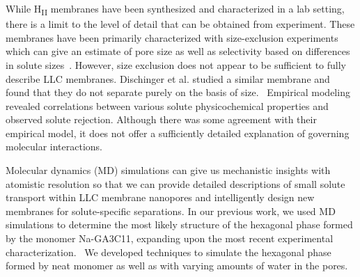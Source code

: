 \documentclass[journal=jpcbfk,manuscript=article]{achemso}
\begin{document}
  While H\textsubscript{II} membranes have been synthesized and characterized
  in a lab setting, there is a limit to the level of detail that can be obtained 
  from experiment. These membranes have been primarily characterized with 
  size-exclusion experiments which can give an estimate of pore size as well as
  selectivity based on differences in solute sizes~\cite{zhou_supported_2005}. 
  However, size exclusion does not appear to be sufficient to fully describe LLC
  membranes. Dischinger et al. studied a similar membrane and found that they do
  not separate purely on the basis of size.~\cite{dischinger_effect_2017} Empirical modeling revealed correlations
  between various solute physicochemical properties and observed solute rejection. 
  Although there was some agreement with their empirical model, it does not
  offer a sufficiently detailed explanation of governing molecular interactions.~\cite{dischinger_effect_2017}

  Molecular dynamics (MD) simulations can give us mechanistic insights with 
  atomistic resolution so that we can provide detailed descriptions of
  small solute transport within LLC membrane nanopores and intelligently design new membranes for 
  solute-specific separations. In our previous work, we used MD simulations to 
  determine the most likely structure of the hexagonal phase formed by the monomer
  Na-GA3C11, expanding upon the most recent experimental characterization.~\cite{coscia_understanding_2018,feng_thin_2016}
  We developed techniques to simulate the hexagonal phase formed by neat 
  monomer as well as with varying amounts of water in the pores.
 
\end{document}
